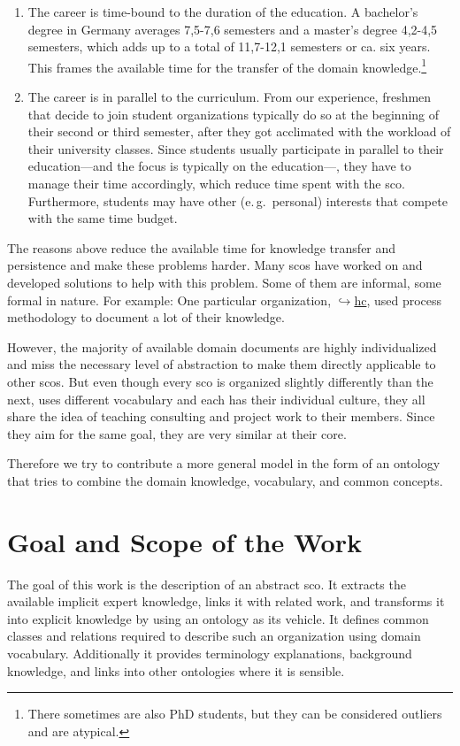 \documentclass[a4paper, DIV=13, BCOR=0cm]{scrbook}
\newcommand{\eg}{e.\,g.\ }
\newcommand{\link}[2]{\href{#1}{$\hookrightarrow$#2}}
\begin{document}
\begin{enumerate}
	\item The career is time-bound to the duration of the education. A bachelor's degree in Germany averages 7,5-7,6 semesters and a master's degree 4,2-4,5 semesters, which adds up to a total of 11,7-12,1 semesters or ca. six years. \cite{stabu2019a} This frames the available time for the transfer of the domain knowledge.\footnote{There sometimes are also PhD students, but they can be considered outliers and are atypical.}
	\item The career is in parallel to the curriculum. From our experience, freshmen that decide to join student organizations typically do so at the beginning of their second or third semester, after they got acclimated with the workload of their university classes. Since students usually participate in parallel to their education---and the focus is typically on the education---, they have to manage their time accordingly, which reduce time spent with the \gls{sco}. Furthermore, students may have other (\eg personal) interests that compete with the same time budget.
\end{enumerate}

The reasons above reduce the available time for knowledge transfer and persistence and make these problems harder. Many \glspl{sco} have worked on and developed solutions to help with this problem. Some of them are informal, some formal in nature. For example: One particular organization, \link{https://hanseaticconsulting.de}{\gls{hc}}, used process methodology to document a lot of their knowledge.

However, the majority of available domain documents are highly individualized and miss the necessary level of abstraction to make them directly applicable to other \glspl{sco}. But even though every \gls{sco} is organized slightly differently than the next, uses different vocabulary and each has their individual culture, they all share the idea of teaching consulting and project work to their members. Since they aim for the same goal, they are very similar at their core.

Therefore we try to contribute a more general model in the form of an ontology that tries to combine the domain knowledge, vocabulary, and common concepts.

\section{Goal and Scope of the Work }
\label{goal}
The goal of this work is the description of an abstract \gls{sco}. It extracts the available implicit expert knowledge, links it with related work, and transforms it into explicit  knowledge by using an ontology as its vehicle. It defines common classes and relations required to describe such an organization using domain vocabulary. Additionally it provides terminology explanations, background knowledge, and links into other ontologies where it is sensible.
\end{document}
